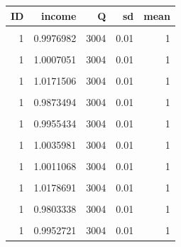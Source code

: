 \documentclass[
]{book}
\begin{document}
\begin{table}[!h]
\centering
\begin{tabular}{r|r|r|r|r}
\hline
ID & income & Q & sd & mean\\
\hline
\cellcolor{gray!6}{1} & \cellcolor{gray!6}{0.9943952} & \cellcolor{gray!6}{3004} & \cellcolor{gray!6}{0.01} & \cellcolor{gray!6}{1}\\
\hline
1 & 0.9976982 & 3004 & 0.01 & 1\\
\hline
\cellcolor{gray!6}{1} & \cellcolor{gray!6}{1.0155871} & \cellcolor{gray!6}{3004} & \cellcolor{gray!6}{0.01} & \cellcolor{gray!6}{1}\\
\hline
1 & 1.0007051 & 3004 & 0.01 & 1\\
\hline
\cellcolor{gray!6}{1} & \cellcolor{gray!6}{1.0012929} & \cellcolor{gray!6}{3004} & \cellcolor{gray!6}{0.01} & \cellcolor{gray!6}{1}\\
\hline
1 & 1.0171506 & 3004 & 0.01 & 1\\
\hline
\cellcolor{gray!6}{1} & \cellcolor{gray!6}{1.0046092} & \cellcolor{gray!6}{3004} & \cellcolor{gray!6}{0.01} & \cellcolor{gray!6}{1}\\
\hline
1 & 0.9873494 & 3004 & 0.01 & 1\\
\hline
\cellcolor{gray!6}{1} & \cellcolor{gray!6}{0.9931315} & \cellcolor{gray!6}{3004} & \cellcolor{gray!6}{0.01} & \cellcolor{gray!6}{1}\\
\hline
1 & 0.9955434 & 3004 & 0.01 & 1\\
\hline
\cellcolor{gray!6}{1} & \cellcolor{gray!6}{1.0122408} & \cellcolor{gray!6}{3004} & \cellcolor{gray!6}{0.01} & \cellcolor{gray!6}{1}\\
\hline
1 & 1.0035981 & 3004 & 0.01 & 1\\
\hline
\cellcolor{gray!6}{1} & \cellcolor{gray!6}{1.0040077} & \cellcolor{gray!6}{3004} & \cellcolor{gray!6}{0.01} & \cellcolor{gray!6}{1}\\
\hline
1 & 1.0011068 & 3004 & 0.01 & 1\\
\hline
\cellcolor{gray!6}{1} & \cellcolor{gray!6}{0.9944416} & \cellcolor{gray!6}{3004} & \cellcolor{gray!6}{0.01} & \cellcolor{gray!6}{1}\\
\hline
1 & 1.0178691 & 3004 & 0.01 & 1\\
\hline
\cellcolor{gray!6}{1} & \cellcolor{gray!6}{1.0049785} & \cellcolor{gray!6}{3004} & \cellcolor{gray!6}{0.01} & \cellcolor{gray!6}{1}\\
\hline
1 & 0.9803338 & 3004 & 0.01 & 1\\
\hline
\cellcolor{gray!6}{1} & \cellcolor{gray!6}{1.0070136} & \cellcolor{gray!6}{3004} & \cellcolor{gray!6}{0.01} & \cellcolor{gray!6}{1}\\
\hline
1 & 0.9952721 & 3004 & 0.01 & 1\\
\hline
\end{tabular}
\end{table}
\end{document}
